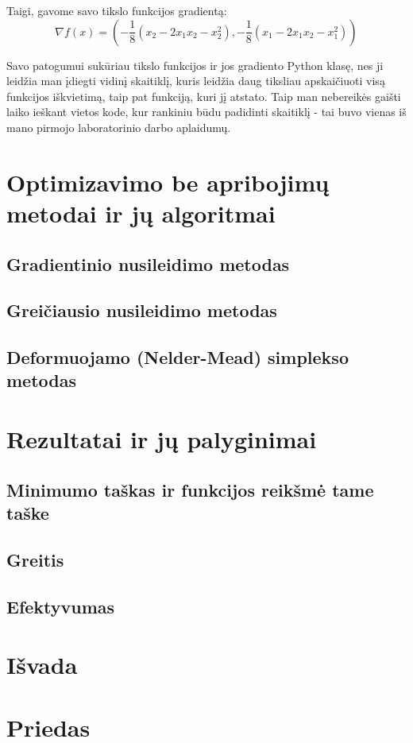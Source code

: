 \documentclass{article}
\begin{document}
Taigi, gavome savo tikslo funkcijos gradientą:
\begin{equation}\label{eq:3}
    \nabla f(x) = (-\frac{1}{8}(x_{2}-2x_{1}x_{2}-x_{2}^2), -\frac{1}{8}(x_{1}-2x_{1}x_{2}-x_{1}^2))
\end{equation}

Savo patogumui sukūriau tikslo funkcijos ir jos gradiento Python klasę, nes ji leidžia man įdiegti vidinį skaitiklį, kuris leidžia daug tiksliau apskaičiuoti visą funkcijos iškvietimą, taip pat funkciją, kuri jį atstato. Taip man nebereikės gaišti laiko ieškant vietos kode, kur rankiniu būdu padidinti skaitiklį - tai buvo vienas iš mano pirmojo laboratorinio darbo aplaidumų.
\section{Optimizavimo be apribojimų metodai ir jų algoritmai}
\subsection{Gradientinio nusileidimo metodas}
\subsection{Greičiausio nusileidimo metodas}
\subsection{Deformuojamo (Nelder-Mead) simplekso metodas}
\section{Rezultatai ir jų palyginimai}
\subsection{Minimumo taškas ir funkcijos reikšmė tame taške}
\subsection{Greitis}
\subsection{Efektyvumas}
\section{Išvada}
\section{Priedas}
\end{document}
